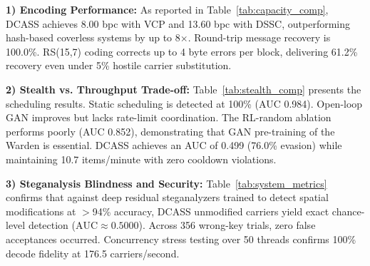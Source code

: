 \documentclass[conference]{IEEEtran}
\begin{document}
\begin{table}[t]
\caption{Media-Layer Steganalysis Resistance and End-to-End System Reliability}
\label{tab:system_metrics}
\centering
{}
\end{table}

\textbf{1) Encoding Performance:} As reported in Table~\ref{tab:capacity_comp}, DCASS achieves 8.00 bpc with VCP and 13.60 bpc with DSSC, outperforming hash-based coverless systems by up to 8$\times$. Round-trip message recovery is 100.0\%. RS(15,7) coding corrects up to 4 byte errors per block, delivering 61.2\% recovery even under 5\% hostile carrier substitution.

\textbf{2) Stealth vs. Throughput Trade-off:} Table~\ref{tab:stealth_comp} presents the scheduling results. Static scheduling is detected at 100\% (AUC 0.984). Open-loop GAN improves but lacks rate-limit coordination. The RL-random ablation performs poorly (AUC 0.852), demonstrating that GAN pre-training of the Warden is essential. DCASS achieves an AUC of 0.499 (76.0\% evasion) while maintaining 10.7 items/minute with zero cooldown violations.

\textbf{3) Steganalysis Blindness and Security:} Table~\ref{tab:system_metrics} confirms that against deep residual steganalyzers trained to detect spatial modifications at $>$94\% accuracy, DCASS unmodified carriers yield exact chance-level detection ($\text{AUC} \approx 0.5000$). Across 356 wrong-key trials, zero false acceptances occurred. Concurrency stress testing over 50 threads confirms 100\% decode fidelity at 176.5 carriers/second.
\end{document}

